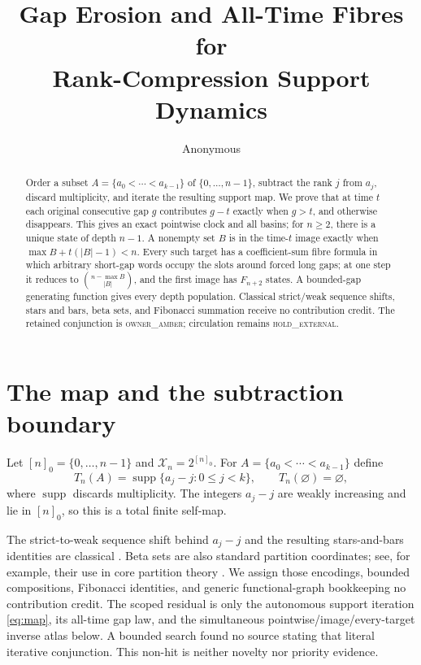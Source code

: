\documentclass[a4paper,10pt]{amsart}
\title[Rank-compression support dynamics]{Gap Erosion and All-Time Fibres for\\
Rank-Compression Support Dynamics}
\author{Anonymous}
\date{}
\theoremstyle{remark}
\newcommand{\X}{\mathcal X}
\newcommand{\supp}{\operatorname{supp}}
\begin{document}
\begin{abstract}
Order a subset $A=\{a_0<\cdots<a_{k-1}\}$ of $\{0,\ldots,n-1\}$,
subtract the rank $j$ from $a_j$, discard multiplicity, and iterate the
resulting support map.  We prove that at time $t$ each original consecutive
gap $g$ contributes $g-t$ exactly when $g>t$, and otherwise disappears.  This
gives an exact pointwise clock and all basins; for $n\ge2$, there is a unique
state of depth $n-1$.  A nonempty set $B$ is in the time-$t$ image exactly when
$\max B+t(|B|-1)<n$.  Every such target has a coefficient-sum fibre formula
in which arbitrary short-gap words occupy the slots around forced long gaps;
at one step it reduces to $\binom{n-\max B}{|B|}$, and the first image has
$F_{n+2}$ states.  A bounded-gap generating function gives every depth
population.  Classical strict/weak sequence shifts, stars and bars, beta
sets, and Fibonacci summation receive no contribution credit.  The retained
conjunction is \textsc{owner\_amber}; circulation remains
\textsc{hold\_external}.
\end{abstract}

\maketitle

\section{The map and the subtraction boundary}

Let $[n]_0=\{0,\ldots,n-1\}$ and $\X_n=2^{[n]_0}$.  For
$A=\{a_0<\cdots<a_{k-1}\}$ define
\begin{equation}\label{eq:map}
 T_n(A)=\supp\{a_j-j:0\le j<k\},\qquad T_n(\varnothing)=\varnothing,
\end{equation}
where $\supp$ discards multiplicity.  The integers $a_j-j$ are weakly
increasing and lie in $[n]_0$, so this is a total finite self-map.

The strict-to-weak sequence shift behind $a_j-j$ and the resulting
stars-and-bars identities are classical \cite{Stanley2012}.  Beta sets are
also standard partition coordinates; see, for example, their use in core
partition theory \cite{Fayers2023}.  We assign those encodings, bounded
compositions, Fibonacci identities, and generic functional-graph
bookkeeping no contribution credit.  The scoped residual is only the
autonomous support iteration \eqref{eq:map}, its all-time gap law, and the
simultaneous pointwise/image/every-target inverse atlas below.  A bounded
search found no source stating that literal iterative conjunction.  This
non-hit is neither novelty nor priority evidence.
\end{document}
